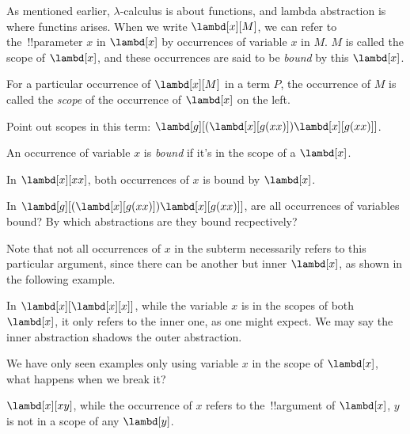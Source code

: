 \documentclass[../../../include/open-logic-section]{subfiles}
\begin{document}

As mentioned earlier, $\lambda$-calculus is about functions, and
lambda abstraction is where functins arises. When we
write $\lambd[x][M]$, we can refer to the~!!{parameter} $x$ in $\lambd[x]$ by
occurrences of variable $x$ in $M$. $M$ is called the
scope of $\lambd[x]$, and these occurrences are said to be \emph{bound} by this
$\lambd[x]$. 

\begin{defn}[Scope]
For a particular occurrence of $\lambd[x][M]$ in a term $P$, the
occurrence of $M$ is called the \emph{scope} of the occurrence of $\lambd[x]$
on the left.
\end{defn}

\begin{prob}
  Point out scopes in this term: $\lambd[g][(\lambd[x][g (x x)]) \lambd[x][g (x x)]]$.
\end{prob}

\begin{defn}
  An occurrence of variable $x$ is \emph{bound} if it's in the scope of a $\lambd[x]$.
\end{defn}

\begin{ex}
  In $\lambd[x][x x]$, both occurrences of $x$ is bound by $\lambd[x]$.
\end{ex}

\begin{prob}
  In $\lambd[g][(\lambd[x][g (x x)]) \lambd[x][g (x x)]]$, are all
  occurrences of variables bound? By which abstractions are they
  bound recpectively?
\end{prob}

Note that not all occurrences of $x$ in the subterm necessarily refers to this particular argument,
since there can be another but inner $\lambd[x]$, as shown in the
following example. 
\begin{ex}
In $\lambd[x][\lambd[x][x]]$, while the variable $x$ is in the
scopes of both $\lambd[x]$, it only refers to the inner one, as one
might expect. We may say the inner abstraction shadows the outer
abstraction.
\end{ex}

We have only seen examples only using variable $x$ in the scope of $\lambd[x]$, 
what happens when we break it?
\begin{ex}
  $\lambd[x][x y]$, while the occurrence of $x$ refers to the~!!{argument} of $\lambd[x]$, $y$ is not in a scope
  of any $\lambd[y]$. 
\end{ex}
\end{document}
